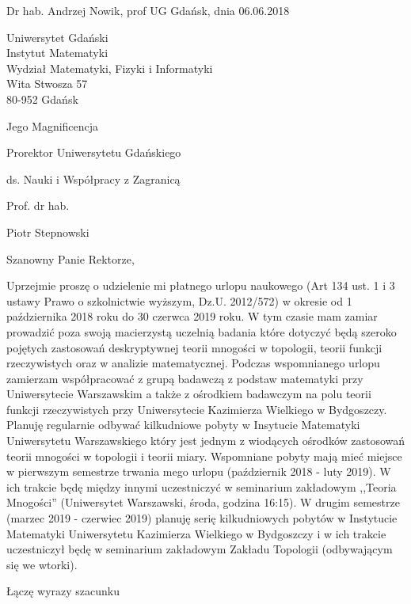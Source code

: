 \documentclass[12pt]{article}
\begin{document}
\large

\bigskip
\bigskip

{\parindent0cm \noindent
Dr hab. Andrzej Nowik, prof UG  \hfill
Gdańsk, dnia 06.06.2018 \par
Uniwersytet Gdański\\
Instytut Matematyki \\
Wydział Matematyki, Fizyki i Informatyki \\
Wita Stwosza 57 \\
80-952 Gdańsk \\
}

\bigskip
\bigskip
\bigskip


\par
{ \parindent6.2cm
 \par
  Jego Magnificencja
 \par
  Prorektor Uniwersytetu Gdańskiego
 \par 
  ds. Nauki i Współpracy z Zagranicą
 \par
  Prof. dr hab. 
 \par 
  Piotr Stepnowski
}

{
\bigskip
\bigskip
\bigskip
\bigskip
\bigskip
Szanowny Panie Rektorze,

\bigskip
\bigskip

  Uprzejmie proszę o udzielenie mi 
płatnego urlopu naukowego (Art 134 ust. 1 i 3
ustawy Prawo o szkolnictwie wyższym, Dz.U. 2012/572)
w okresie od 1 października 2018 roku do 30 czerwca 2019 roku.
  W tym czasie mam zamiar prowadzić poza swoją macierzystą uczelnią 
badania które dotyczyć będą szeroko pojętych zastosowań deskryptywnej teorii mnogości
w topologii, teorii funkcji rzeczywistych oraz w analizie matematycznej. 
  Podczas wspomnianego urlopu zamierzam współpracować
z grupą badawczą z podstaw matematyki przy 
Uniwersytecie Warszawskim a także
z ośrodkiem badawczym na polu teorii funkcji rzeczywistych
przy Uniwersytecie Kazimierza Wielkiego w Bydgoszczy.
  Planuję regularnie odbywać kilkudniowe pobyty
w Insytucie Matematyki Uniwersytetu Warszawskiego
który jest jednym z wiodących ośrodków zastosowań teorii
mnogości w topologii i teorii miary. Wspomniane 
pobyty mają mieć miejsce w pierwszym semestrze trwania mego urlopu 
(październik 2018 - luty 2019). W ich trakcie
będę między innymi uczestniczyć w seminarium 
zakładowym ,,Teoria Mnogości'' (Uniwersytet Warszawski, środa, godzina 16:15).
  W drugim semestrze (marzec 2019 - czerwiec 2019) 
planuję serię kilkudniowych pobytów
w Instytucie Matematyki Uniwersytetu Kazimierza Wielkiego w Bydgoszczy
i w ich trakcie uczestniczył będę w seminarium
zakładowym Zakładu Topologii (odbywającym się we wtorki).
}
\bigskip
\bigskip
{\parindent8cm \par
Łączę wyrazy szacunku 
}
\end{document}
